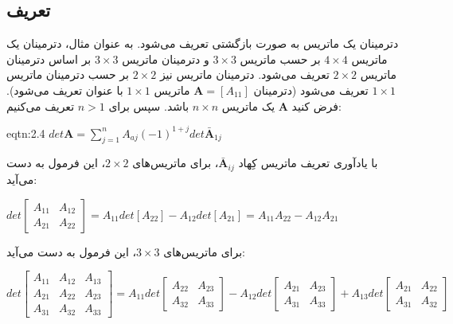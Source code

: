 \subsection{\textbf{تعریف}}
\label{subsec:2.5.2}
{
    \Large
    \begin{spacing}{1.3}
        دترمینان یک ماتریس به صورت بازگشتی تعریف می‌شود.
        به عنوان مثال، دترمینان یک ماتریس $4\times 4$ بر حسب ماتریس $3\times 3$ و دترمینان ماتریس $3\times 3$ بر اساس دترمینان ماتریس $2\times 2$ تعریف می‌شود.
        دترمینان ماتریس نیز $2\times 2$ بر حسب دترمینان ماتریس $1\times 1$ تعریف می‌شود
        (دترمینان $\textbf{A}=[A_{11}]$ ماتریس $1\times 1$ با عنوان  تعریف می‌شود).
        فرض کنید $\textbf{A}$ یک ماتریس $n\times n$ باشد. سپس برای $n>1$ تعریف می‌کنیم:

        \begin{eqtn}{eqtn:2.4}
            \centering
            $det\textbf{A}=\sum\limits_{j=1}^{n}A_{aj}(-1)^{1+j}det\bar{\textbf{A}}_{1j}$
        \end{eqtn}

        با یادآوری تعریف ماتریس کِهاد $\bar{\textbf{A}}_{ij}$، برای ماتریس‌های $2\times 2$، این فرمول به دست می‌آید:

        \begin{center}
            $det\begin{bmatrix}
                    A_{11} & A_{12} \\
                    A_{21} & A_{22}
            \end{bmatrix}=A_{11}det[A_{22}]-A_{12}det[A_{21}]=A_{11}A_{22}-A_{12}A_{21}$
        \end{center}

        برای ماتریس‌های $3\times 3$، این فرمول به دست می‌آید:

        \begin{flushleft}
            $det\begin{bmatrix}
                    A_{11} & A_{12} & A_{13} \\
                    A_{21} & A_{22} & A_{23} \\
                    A_{31} & A_{32} & A_{33}
            \end{bmatrix}=A_{11}det\begin{bmatrix}
                                       A_{22} & A_{23} \\
                                       A_{32} & A_{33}
            \end{bmatrix}-A_{12}det\begin{bmatrix}
                                       A_{21} & A_{23} \\
                                       A_{31} & A_{33}
            \end{bmatrix}+A_{13}det\begin{bmatrix}
                                       A_{21} & A_{22} \\
                                       A_{31} & A_{32}
            \end{bmatrix}$
        \end{flushleft}


\end{spacing}}
